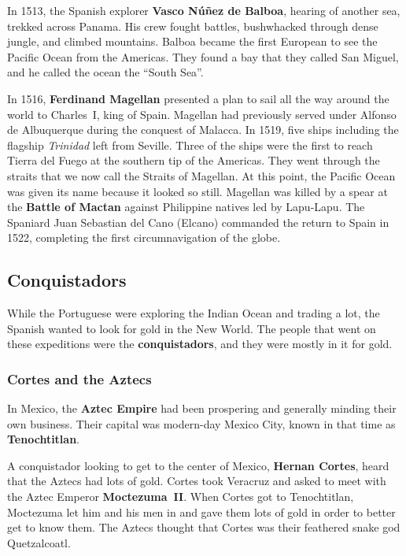 In 1513, the Spanish explorer \textbf{Vasco N\'u\~nez de Balboa},
hearing of another sea, trekked across Panama.
His crew fought battles, bushwhacked through dense jungle, and climbed mountains.
Balboa became the first European to see the Pacific Ocean from the Americas.
They found a bay that they called San Miguel, and he called the ocean the ``South Sea''.

In 1516, \textbf{Ferdinand Magellan} presented a plan
to sail all the way around the world to Charles~I, king of Spain.
Magellan had previously served under Alfonso de Albuquerque during the conquest of Malacca.
In 1519, five ships including the flagship \textit{Trinidad} left from Seville.
Three of the ships were the first to reach Tierra del Fuego at the southern tip of the Americas.
They went through the straits that we now call the Straits of Magellan.
At this point, the Pacific Ocean was given its name because it looked so still.
Magellan was killed by a spear
at the \textbf{Battle of Mactan} against Philippine natives led by Lapu-Lapu.
The Spaniard Juan Sebastian del Cano (Elcano) commanded the return to Spain in 1522,
completing the first circumnavigation of the globe.

\subsection*{Conquistadors}

While the Portuguese were exploring the Indian Ocean and trading a lot,
the Spanish wanted to look for gold in the New World.
The people that went on these expeditions were the \textbf{conquistadors},
and they were mostly in it for gold.

\subsubsection*{Cortes and the Aztecs}

In Mexico, the \textbf{Aztec Empire} had been prospering and generally minding their own business.
Their capital was modern-day Mexico City, known in that time as \textbf{Tenochtitlan}.

A conquistador looking to get to the center of Mexico,
\textbf{Hernan Cortes}, heard that the Aztecs had lots of gold.
Cortes took Veracruz and asked to meet with the Aztec Emperor \textbf{Moctezuma~II}.
When Cortes got to Tenochtitlan,
Moctezuma let him and his men in and gave them lots of gold in order to better get to know them.
The Aztecs thought that Cortes was their feathered snake god Quetzalcoatl.

